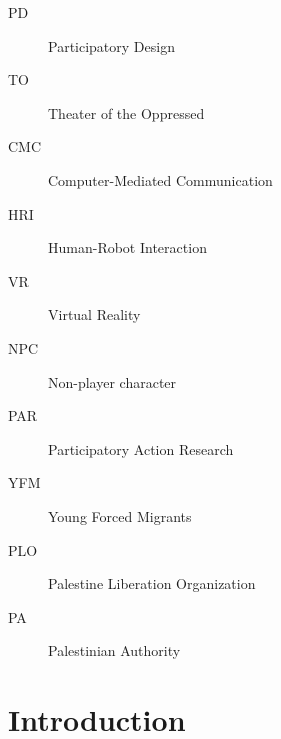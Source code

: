 \documentclass[dissertation,math,vertlayout,pdfa,colorlinks]{aaltoseries}
\begin{document}
\clearpage
\tableofcontents


\listofpublications

\listoffigures
\listoftables


\abbreviations

\begin{description}
\item[PD] Participatory Design
\item[TO] Theater of the Oppressed
\item[CMC] Computer-Mediated Communication
\item[HRI] Human-Robot Interaction
\item[VR] Virtual Reality
\item[NPC] Non-player character
\item[PAR] Participatory Action Research
\item[YFM] Young Forced Migrants
\item[PLO] Palestine Liberation Organization
\item[PA] Palestinian Authority
\end{description}


\chapter{Introduction}
\end{document}
